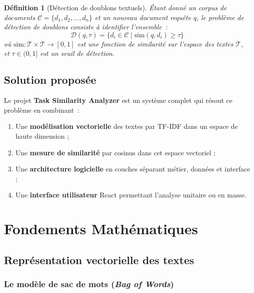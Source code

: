 \documentclass[12pt, a4paper]{article}
\newtheorem{definition}{Définition}[section]
\begin{document}
\begin{definition}[Détection de doublons textuels]
Étant donné un corpus de documents $\mathcal{C} = \{d_1, d_2, \ldots, d_n\}$ et un nouveau document requête $q$, le problème de détection de doublons consiste à identifier l'ensemble~:
\[
\mathcal{D}(q, \tau) = \bigl\{ d_i \in \mathcal{C} \;\big|\; \mathrm{sim}(q, d_i) \geq \tau \bigr\}
\]
où $\mathrm{sim} : \mathcal{T} \times \mathcal{T} \to [0,1]$ est une fonction de similarité sur l'espace des textes $\mathcal{T}$, et $\tau \in (0,1]$ est un seuil de détection.
\end{definition}

\subsection{Solution proposée}

Le projet \textbf{Task Similarity Analyzer} est un système complet qui résout ce problème en combinant~:

\begin{enumerate}
  \item Une \textbf{modélisation vectorielle} des textes par TF-IDF dans un espace de haute dimension ;
  \item Une \textbf{mesure de similarité} par cosinus dans cet espace vectoriel ;
  \item Une \textbf{architecture logicielle} en couches séparant métier, données et interface ;
  \item Une \textbf{interface utilisateur} React permettant l'analyse unitaire ou en masse.
\end{enumerate}

\section{Fondements Mathématiques}

\subsection{Représentation vectorielle des textes}

\subsubsection{Le modèle de sac de mots (\textit{Bag of Words})}
\end{document}
